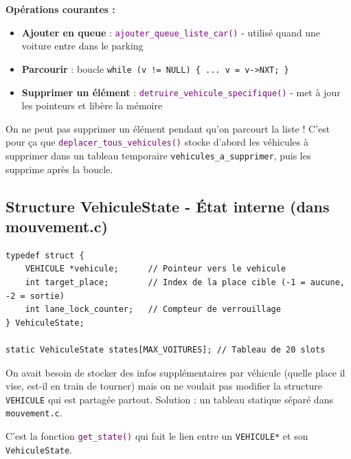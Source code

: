 \documentclass[11pt,a4paper]{article}
\newcommand{\code}[1]{\texttt{\textcolor{accent}{#1}}}
\newcommand{\fichier}[1]{\texttt{\textcolor{primary}{\faIcon{file-code} #1}}}
\newcommand{\fonction}[1]{\texttt{\textcolor{purple}{#1()}}}
\newcommand{\variable}[1]{\texttt{\textcolor{success}{#1}}}
\begin{document}
\textbf{Opérations courantes :}

\begin{itemize}
    \item \textbf{Ajouter en queue} : \fonction{ajouter\_queue\_liste\_car} - utilisé quand une voiture entre dans le parking
    \item \textbf{Parcourir} : boucle \code{while (v != NULL) \{ ... v = v->NXT; \}}
    \item \textbf{Supprimer un élément} : \fonction{detruire\_vehicule\_specifique} - met à jour les pointeurs et libère la mémoire
\end{itemize}

\begin{dangerbox}
On ne peut pas supprimer un élément pendant qu'on parcourt la liste ! C'est pour ça que \fonction{deplacer\_tous\_vehicules} stocke d'abord les véhicules à supprimer dans un tableau temporaire \variable{vehicules\_a\_supprimer}, puis les supprime après la boucle.
\end{dangerbox}

\subsection{Structure VehiculeState - État interne (dans mouvement.c)}

\begin{codebox}
\begin{lstlisting}
typedef struct {
    VEHICULE *vehicule;      // Pointeur vers le vehicule
    int target_place;        // Index de la place cible (-1 = aucune, -2 = sortie)
    int lane_lock_counter;   // Compteur de verrouillage
} VehiculeState;

static VehiculeState states[MAX_VOITURES]; // Tableau de 20 slots
\end{lstlisting}
\end{codebox}

\begin{warningbox}
On avait besoin de stocker des infos supplémentaires par véhicule (quelle place il vise, est-il en train de tourner) mais on ne voulait pas modifier la structure \variable{VEHICULE} qui est partagée partout. Solution : un tableau statique séparé dans \fichier{mouvement.c}.
\end{warningbox}

C'est la fonction \fonction{get\_state} qui fait le lien entre un \variable{VEHICULE*} et son \variable{VehiculeState}.
\end{document}
